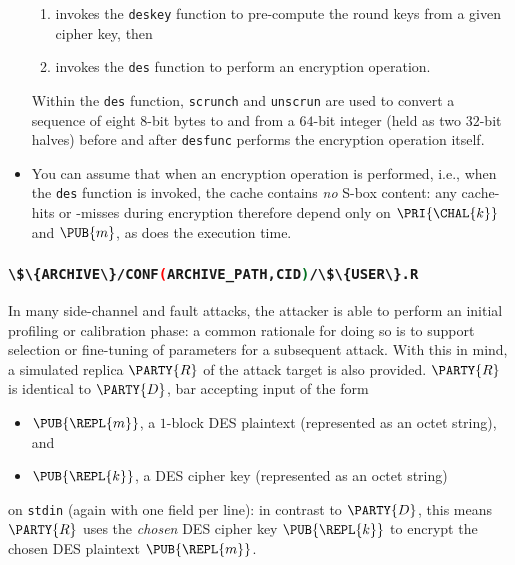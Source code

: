 \documentclass[crop={false},multi={true},tikz={true}]{standalone}
\begin{document}
\begin{itemize}
      \begin{enumerate}
      \item invokes the \lstinline[language=C]{deskey} function
            to pre-compute the round keys from a given cipher key,
            then
      \item invokes the \lstinline[language=C]{des}    function
            to perform an encryption operation.
      \end{enumerate}

      \noindent
      Within the 
      \lstinline[language=C]{des}
      function, 
      \lstinline[language=C]{scrunch} and \lstinline[language=C]{unscrun}
      are used to convert a sequence of eight $8$-bit bytes to and from a
      $64$-bit integer (held as two $32$-bit halves) before and after 
      \lstinline[language=C]{desfunc}
      performs the encryption operation itself.
\item You can assume that when an encryption operation is performed, i.e.,
      when the
      \lstinline[language=C]{des}
      function is invoked, the cache contains {\em no} S-box content: any
      cache-hits or -misses during encryption therefore depend only on 
      $\PRI{\CHAL{k}}$ and $\PUB{m}$, as does the execution time.
\end{itemize}

\subsubsection{\lstinline[language={bash}]|\$\{ARCHIVE\}/CONF(ARCHIVE_PATH,CID)/\$\{USER\}.R|}

In many side-channel and fault attacks, the attacker is able to perform an 
initial profiling or calibration phase: a common rationale for doing so is 
to support selection or fine-tuning of parameters for a subsequent attack.  
With this in mind, a simulated replica $\PARTY{R}$ of the attack target is 
also provided.
$\PARTY{R}$ is identical to $\PARTY{D}$, bar accepting input of the form

\begin{itemize}
\item $\PUB{\REPL{m}}$, 
      a $1$-block DES plaintext
      (represented as an           octet string),
      and
\item $\PUB{\REPL{k}}$, 
      a           DES cipher key
      (represented as an           octet string)
\end{itemize}

\noindent
on \lstinline[language={bash}]{stdin} (again with one field per line):
in contrast to $\PARTY{D}$, this means $\PARTY{R}$ uses the
{\em chosen} DES cipher key $\PUB{\REPL{k}}$
to encrypt the
     chosen  DES  plaintext $\PUB{\REPL{m}}$.
\end{document}
